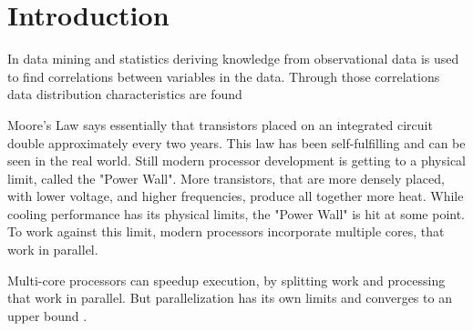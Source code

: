 \chapter{Introduction}
In data mining and statistics deriving knowledge from observational data is used to find correlations between variables in the data. Through those correlations data distribution characteristics are found


Moore's Law \cite{mooreCrammingMoreComponents1965} says essentially that transistors placed on an integrated circuit double approximately every two years. This law has been self-fulfilling and can be seen in the real world. Still modern processor development is getting to a physical limit, called the "Power Wall". More transistors, that are more densely placed, with lower voltage, and higher frequencies, produce all together more heat. While cooling performance has its physical limits, the "Power Wall" is hit at some point. To work against this limit, modern processors incorporate multiple cores, that work in parallel.

Multi-core processors can speedup execution, by splitting work and processing that work in parallel. But parallelization has its own limits and converges to an upper bound  \cite{amdahlValiditySingleProcessor1967}.


\cite{esmaeilzadehDarkSiliconEnd2011}



